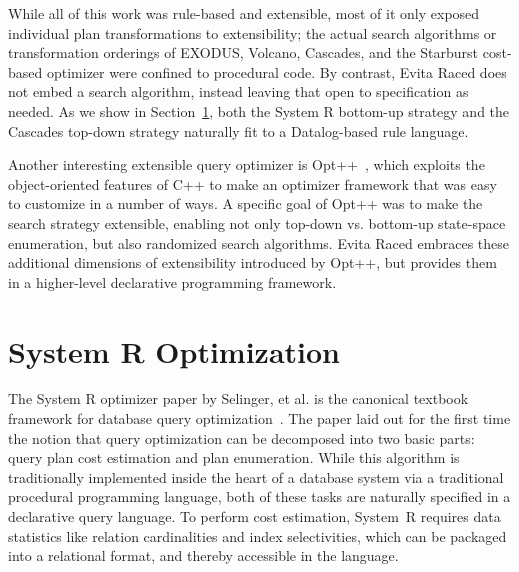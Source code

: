 While all of this work was rule-based and extensible, most of it only exposed
individual plan transformations to extensibility; the actual search algorithms
or transformation orderings of EXODUS, Volcano, Cascades, and the Starburst
cost-based optimizer were confined to procedural code.  By contrast, Evita
Raced does not embed a search algorithm, instead leaving that open to
specification as needed.  As we show in Section~\ref{ch:opt:sec:systemr}, both
the System R bottom-up strategy and the Cascades top-down strategy naturally
fit to a Datalog-based rule language.

Another interesting extensible query optimizer is Opt++~\cite{kabradewitt},
which exploits the object-oriented features of C++ to make an optimizer
framework that was easy to customize in a number of ways.  A specific goal of
Opt++ was to make the search strategy extensible, enabling not only top-down
vs.  bottom-up state-space enumeration, but also randomized search algorithms.
Evita Raced embraces these additional dimensions of extensibility introduced by
Opt++, but provides them in a higher-level declarative programming framework.


\section{System R Optimization}
\label{ch:opt:sec:systemr}

The System R optimizer paper by Selinger, et al.  is the canonical textbook
framework for database query optimization~\cite{selinger}.  The paper laid out
for the first time the notion that query optimization can be decomposed into
two basic parts: query plan cost estimation and plan enumeration.  While this
algorithm is traditionally implemented inside the heart of a database system
via a traditional procedural programming language, both of these tasks are
naturally specified in a declarative query language.  To perform cost
estimation, System~R requires data statistics like relation cardinalities and
index selectivities, which can be packaged into a relational format, and
thereby accessible in the \OVERLOG language.

